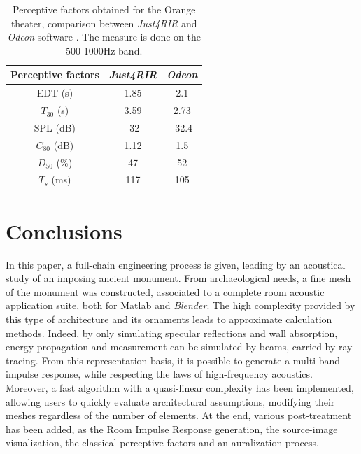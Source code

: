 \documentclass[AMA,STIX1COL]{WileyNJD-v2}
\begin{document}
\begin{table}[h]
\centering
 \begin{tabular}{| *{3}{c|}} 
 \hline 
 Perceptive factors & \textit{Just4RIR} & \textit{Odeon} \\ 
 \hline 
 \hline 
  EDT (s)& 1.85& 2.1 \\ 
 \hline 
$T_{30}$ (s)& 3.59&  2.73\\ 
 \hline 
SPL (dB) &-32 & -32.4\\ 
 \hline 
$C_{80}$ (dB)& 1.12&1.5  \\ 
 \hline 
$D_{50}$ (\%)&47 & 52 \\ 
 \hline 
$T_s$ (ms)&117 & 105 \\ 
 \hline 
\end{tabular} 
 \caption{Perceptive factors obtained for the Orange theater, comparison between \textit{Just4RIR} and \textit{Odeon} software \cite{odeon}. The measure is done on the 500-1000Hz band.}
 \label{tab_rindel} 
 \end{table}

\section{Conclusions}

In this paper, a full-chain engineering process is given, leading by an acoustical study of an imposing ancient monument. From archaeological needs, a fine mesh of the monument was constructed, associated to a complete room acoustic application suite, both for Matlab and \textit{Blender}. The high complexity provided by this type of architecture and its ornaments leads to approximate calculation methods. Indeed, by only simulating specular reflections and wall absorption, energy propagation and measurement can be simulated by beams, carried by ray-tracing. From this representation basis, it is possible to generate a multi-band impulse response, while respecting the laws of high-frequency acoustics. Moreover, a fast algorithm with a quasi-linear complexity has been implemented, allowing users to quickly evaluate architectural assumptions, modifying their meshes regardless of the number of elements. At the end, various post-treatment has been added, as the Room Impulse Response generation, the source-image visualization, the classical perceptive factors and an auralization process.
\end{document}
